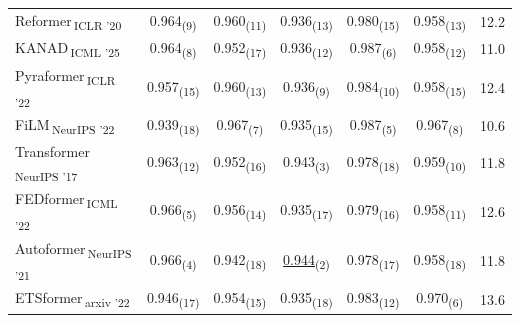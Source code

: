 \begin{table}[htbp]
\begin{tabular}{l|ccccc|c}
Reformer\,\textsubscript{ICLR '20} & 0.964\textsubscript{(9)} & 0.960\textsubscript{(11)} & 0.936\textsubscript{(13)} & 0.980\textsubscript{(15)} & 0.958\textsubscript{(13)} & 12.2 \\
KANAD\,\textsubscript{ICML '25} & 0.964\textsubscript{(8)} & 0.952\textsubscript{(17)} & 0.936\textsubscript{(12)} & 0.987\textsubscript{(6)} & 0.958\textsubscript{(12)} & 11.0 \\
Pyraformer\,\textsubscript{ICLR '22} & 0.957\textsubscript{(15)} & 0.960\textsubscript{(13)} & 0.936\textsubscript{(9)} & 0.984\textsubscript{(10)} & 0.958\textsubscript{(15)} & 12.4 \\
FiLM\,\textsubscript{NeurIPS '22} & 0.939\textsubscript{(18)} & 0.967\textsubscript{(7)} & 0.935\textsubscript{(15)} & 0.987\textsubscript{(5)} & 0.967\textsubscript{(8)} & 10.6 \\
Transformer\,\textsubscript{NeurIPS '17} & 0.963\textsubscript{(12)} & 0.952\textsubscript{(16)} & 0.943\textsubscript{(3)} & 0.978\textsubscript{(18)} & 0.959\textsubscript{(10)} & 11.8 \\
FEDformer\,\textsubscript{ICML '22} & 0.966\textsubscript{(5)} & 0.956\textsubscript{(14)} & 0.935\textsubscript{(17)} & 0.979\textsubscript{(16)} & 0.958\textsubscript{(11)} & 12.6 \\
Autoformer\,\textsubscript{NeurIPS '21} & 0.966\textsubscript{(4)} & 0.942\textsubscript{(18)} & \underline{0.944}\textsubscript{(2)} & 0.978\textsubscript{(17)} & 0.958\textsubscript{(18)} & 11.8 \\
ETSformer\,\textsubscript{arxiv '22} & 0.946\textsubscript{(17)} & 0.954\textsubscript{(15)} & 0.935\textsubscript{(18)} & 0.983\textsubscript{(12)} & 0.970\textsubscript{(6)} & 13.6 \\
\bottomrule
\end{tabular}
\end{table}